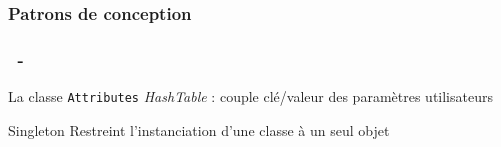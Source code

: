 \documentclass[11pt]{beamer}
\begin{document}
\subsubsection*{Patrons de conception}

\begin{frame}
\frametitle{\subsecname ~- \subsubsecname}
\begin{block}{La classe \texttt{Attributes}}
		\emph{HashTable} : couple clé/valeur des paramètres utilisateurs
	\end{block}
	\begin{block}{Singleton}
			 Restreint l'instanciation d'une classe à un seul objet
	\end{block}
	

\end{frame}
\end{document}

